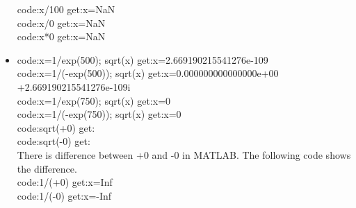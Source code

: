 \documentclass{article}
\begin{document}
\begin{itemize}
code:x/100 \quad get:\quad x=NaN\\
code:x/0 \quad get:\quad x=NaN\\
code:x*0 \quad get:\quad x=NaN
\item code:x=1/exp(500); sqrt(x) \quad get:\quad x=2.669190215541276e-109\\
code:x=1/(-exp(500)); sqrt(x) \quad get:\quad x=0.000000000000000e+00 +2.669190215541276e-109i\\
code:x=1/exp(750); sqrt(x) \quad get:\quad x=0\\
code:x=1/(-exp(750)); sqrt(x) \quad get:\quad x=0\\
code:sqrt(+0) \quad get:\\
code:sqrt(-0) \quad get:\\
There is difference between +0 and -0 in MATLAB. The following code shows the difference.\\
code:1/(+0) \quad get:\quad x=Inf\\
code:1/(-0) \quad get:\quad x=-Inf
\end{itemize}
\end{document}
